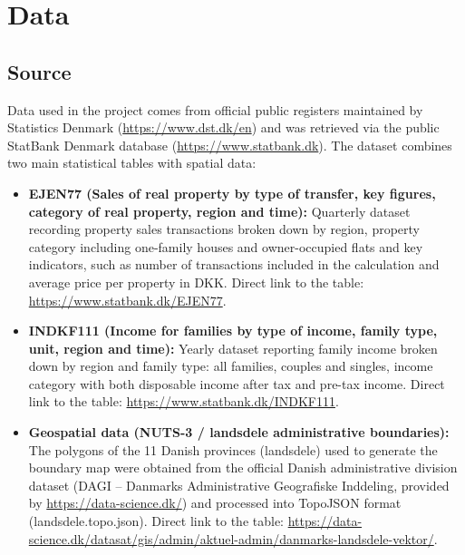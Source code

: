 \section{Data}
\label{sec:data}

\subsection{Source}
Data used in the project comes from official public registers maintained by Statistics Denmark (\url{https://www.dst.dk/en}) 
and was retrieved via the public StatBank Denmark database (\url{https://www.statbank.dk}). The dataset combines two main statistical tables with spatial data:
\begin{itemize}
\item \textbf{EJEN77 (Sales of real property by type of transfer, key figures, category of real property, region and time):} Quarterly dataset recording property sales transactions broken down by region, property category including one-family houses and owner-occupied flats and key indicators, such as number of transactions included in the calculation and average price per property in DKK. Direct link to the table: \url{https://www.statbank.dk/EJEN77}.
\item \textbf{INDKF111 (Income for families by type of income, family type, unit, region and time):} Yearly dataset reporting family income broken down by region and family type: all families, couples and singles, income category with both disposable income after tax and pre-tax income. Direct link to the table: \url{https://www.statbank.dk/INDKF111}.
\item \textbf{Geospatial data (NUTS-3 / landsdele administrative boundaries):} The polygons of the 11 Danish provinces (landsdele) used to generate the boundary map were obtained from the official Danish administrative division dataset (DAGI – Danmarks Administrative Geografiske Inddeling, provided by \url{https://data-science.dk/}) and processed into TopoJSON format (landsdele.topo.json). Direct link to the table: \url{https://data-science.dk/datasat/gis/admin/aktuel-admin/danmarks-landsdele-vektor/}.
\end{itemize}

